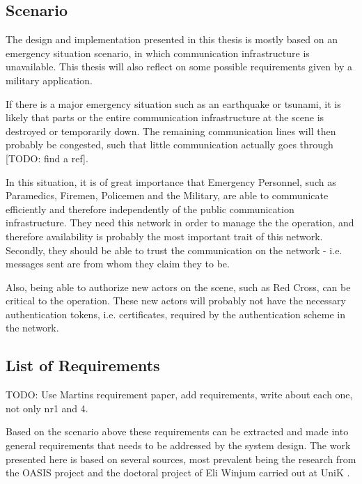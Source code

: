 \subsection{Scenario}
The design and implementation presented in this thesis is mostly based on an
emergency situation scenario, in which communication infrastructure is
unavailable. This thesis will also reflect on some possible requirements given
by a military application.

If there is a major emergency situation such as an earthquake or tsunami, it is
likely that parts or the entire communication infrastructure at the scene
is destroyed or temporarily down. The remaining communication lines will then
probably be congested, such that little communication actually goes through
[TODO: find a ref].

In this situation, it is of great importance that Emergency Personnel, such as
Paramedics, Firemen, Policemen and the Military, are able to communicate
efficiently and therefore independently of the public communication
infrastructure. They need this network in order to manage the the operation, and
therefore availability is probably the most important trait of this network.
Secondly, they should be able to trust the communication on the network - i.e.
messages sent are from whom they claim they to be.

Also, being able to authorize new actors on the scene, such as Red Cross, can be
critical to the operation. These new actors will probably not have the necessary
authentication tokens, i.e. certificates, required by the authentication scheme
in the network.

\subsection{List of Requirements}
TODO: Use Martins requirement paper, add requirements, write about each one, not
only nr1 and 4.

Based on the scenario above these requirements can be extracted and made into
general requirements that needs to be addressed by the system design. The work
presented here is based on several sources, most prevalent being the research
from the OASIS project \cite{oasis_report} \cite{5683058} \cite{nyre2009secure}
and the doctoral project of Eli Winjum carried out at UniK
\cite{ffi_2005_04015}.

